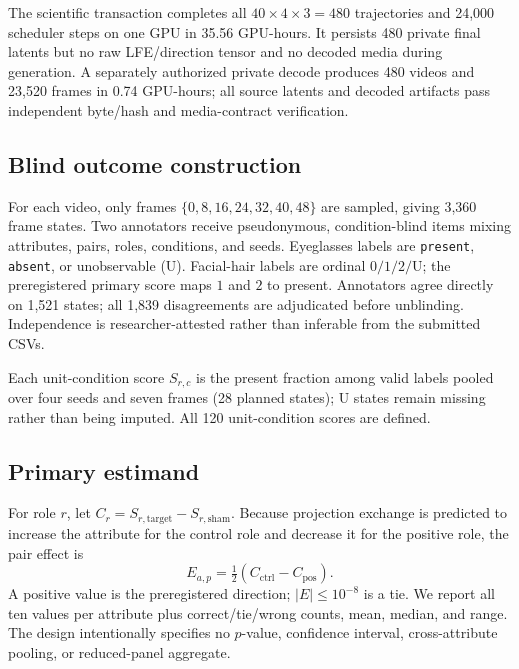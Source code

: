 \documentclass[10pt,twocolumn,letterpaper]{article}
\begin{document}
The scientific transaction completes all $40\times4\times3=480$ trajectories and 24,000 scheduler steps on one GPU in 35.56 GPU-hours.  It persists 480 private final latents but no raw LFE/direction tensor and no decoded media during generation.  A separately authorized private decode produces 480 videos and 23,520 frames in 0.74 GPU-hours; all source latents and decoded artifacts pass independent byte/hash and media-contract verification.

\subsection{Blind outcome construction}

For each video, only frames $\{0,8,16,24,32,40,48\}$ are sampled, giving 3,360 frame states.  Two annotators receive pseudonymous, condition-blind items mixing attributes, pairs, roles, conditions, and seeds.  Eyeglasses labels are \texttt{present}, \texttt{absent}, or unobservable (U).  Facial-hair labels are ordinal $0/1/2/$U; the preregistered primary score maps $1$ and $2$ to present.  Annotators agree directly on 1,521 states; all 1,839 disagreements are adjudicated before unblinding.  Independence is researcher-attested rather than inferable from the submitted CSVs.

Each unit-condition score $S_{r,c}$ is the present fraction among valid labels pooled over four seeds and seven frames (28 planned states); U states remain missing rather than being imputed.  All 120 unit-condition scores are defined.

\subsection{Primary estimand}

For role $r$, let $C_r=S_{r,\mathrm{target}}-S_{r,\mathrm{sham}}$.  Because projection exchange is predicted to increase the attribute for the control role and decrease it for the positive role, the pair effect is
\begin{equation}
 E_{a,p}=\tfrac{1}{2}\left(C_{\mathrm{ctrl}}-C_{\mathrm{pos}}\right).
 \label{eq:estimand}
\end{equation}
A positive value is the preregistered direction; $|E|\le10^{-8}$ is a tie.  We report all ten values per attribute plus correct/tie/wrong counts, mean, median, and range.  The design intentionally specifies no $p$-value, confidence interval, cross-attribute pooling, or reduced-panel aggregate.
\end{document}
